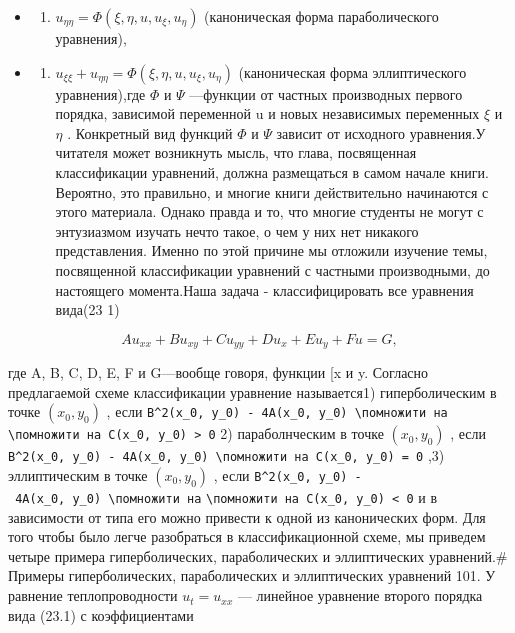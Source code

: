 \documentclass[
  ukrainian,
]{article}
\providecommand{\tightlist}{%
  \setlength{\itemsep}{0pt}\setlength{\parskip}{0pt}}
\begin{document}
\begin{itemize}
\tightlist
\item
  \begin{enumerate}
  \def\labelenumi{\arabic{enumi}.}
  \setcounter{enumi}{1}
  \tightlist
  \item
    \(u_{\eta\eta} = \Phi(\xi, \eta, u, u_{\xi}, u_{\eta})\)
    (каноническая форма параболического уравнения),
  \end{enumerate}
\item
  \begin{enumerate}
  \def\labelenumi{\arabic{enumi}.}
  \setcounter{enumi}{2}
  \tightlist
  \item
    \(u_{\xi\xi} + u_{\eta\eta} = \Phi(\xi, \eta, u, u_{\xi}, u_{\eta})\)
    (каноническая форма эллиптического уравнения),где \(\Phi\) и
    \(\Psi\) ---функции от частных производных первого порядка,
    зависимой переменной u и новых независимых переменных \(\xi\) и
    \(\eta\) . Конкретный вид функций \(\Phi\) и \(\Psi\) зависит от
    исходного уравнения.У читателя может возникнуть мысль, что глава,
    посвященная классификации уравнений, должна размещаться в самом
    начале книги. Вероятно, это правильно, и многие книги действительно
    начинаются с этого материала. Однако правда и то, что многие
    студенты не могут с энтузиазмом изучать нечто такое, о чем у них нет
    никакого представления. Именно по этой причине мы отложили изучение
    темы, посвященной классификации уравнений с частными производными,
    до настоящего момента.Наша задача - классифицировать все уравнения
    вида(23 1)
  \end{enumerate}
\end{itemize}

\[
Au_{xx} + Bu_{xy} + Cu_{yy} + Du_x + Eu_y + Fu = G,
\]

где A, B, C, D, E, F и G---вообще говоря, функции {[}x и y. Согласно
предлагаемой схеме классификации уравнение называется1) гиперболическим
в точке \((x_0, y_0)\) , если
\texttt{B\^{}2(x\_0,\ y\_0)\ -\ 4A(x\_0,\ y\_0)\ \textbackslash{}помножити\ на}
\texttt{\textbackslash{}помножити\ на\ C(x\_0,\ y\_0)\ \textgreater{}\ 0}
2) параболнческим в точке \((x_0, y_0)\) , если
\texttt{B\^{}2(x\_0,\ y\_0)\ -\ 4A(x\_0,\ y\_0)\ \textbackslash{}помножити\ на\ C(x\_0,\ y\_0)\ =\ 0}
,3) эллиптическим в точке \((x_0, y_0)\) , если
\texttt{B\^{}2(x\_0,\ y\_0)\ -\ 4A(x\_0,\ y\_0)\ \textbackslash{}помножити\ на}
\texttt{\textbackslash{}помножити\ на\ C(x\_0,\ y\_0)\ \textless{}\ 0} и
в зависимости от типа его можно привести к одной из канонических форм.
Для того чтобы было легче разобраться в классификационной схеме, мы
приведем четыре примера гиперболических, параболических и эллиптических
уравнений.\# Примеры гиперболических, параболических и эллиптических
уравнений 101. У равнение теплопроводности \(u_t = u_{xx}\) --- линейное
уравнение второго порядка вида (23.1) с коэффициентами
\end{document}
